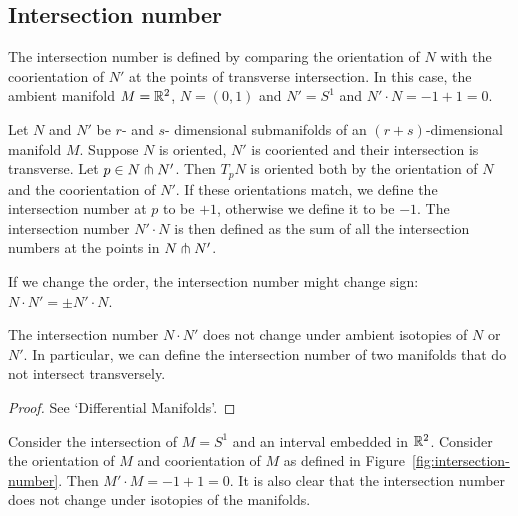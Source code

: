 


\subsection*{Intersection number}

\begin{marginfigure}
    \centering
    \caption{
        The intersection number is defined by comparing the orientation of $N$ with the coorientation of $N'$ at the points of transverse intersection.
        In this case, the ambient manifold $M = \mathbb{R}^2$, $N = (0,1)$ and $N' = S^1$ and $N' \cdot N = -1 + 1 = 0$.
    }
    \label{fig:intersection-number}
\end{marginfigure}
\begin{definition}
    Let $N$ and  $N'$ be $r$- and  $s$- dimensional submanifolds of an $(r+s)$-dimensional manifold $M$.
    Suppose $N$ is oriented, $N'$ is cooriented and their intersection is transverse.
    Let $p \in  N \pitchfork N'$.
    Then $T_p N$ is oriented both by the orientation of  $N$ and the coorientation of  $N'$.
    If these orientations match, we define the intersection number at $p$ to be $+1$, otherwise we define it to be $-1$.
    The intersection number  $N' \cdot N$ is then defined as the sum of all the intersection numbers at the points in $N \pitchfork N'$.
\end{definition}
\begin{remark}
    If we change the order, the intersection number might change sign: $N \cdot N' =  \pm N' \cdot N$.
\end{remark}
\begin{prop}
    The intersection number $N \cdot N'$ does not change under ambient isotopies of $N$ or $N'$.
    In particular, we can define the intersection number of two manifolds that do not intersect transversely.
\end{prop}
\begin{proof}
    See `Differential Manifolds'.
\end{proof}
\begin{eg}
    Consider the intersection of $M  = S^{1}$ and an interval embedded in $\mathbb{R}^2$. Consider the orientation of $M$ and coorientation of $M$ as defined in Figure~\ref{fig:intersection-number}. Then $M' \cdot M  = -1 + 1 = 0$.
    It is also clear that the intersection number does not change under isotopies of the manifolds.
\end{eg}


